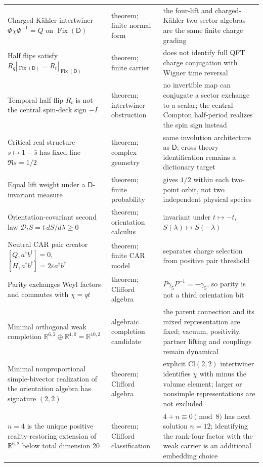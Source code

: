 \documentclass[11pt]{article}
\theoremstyle{definition}\newtheorem{definition}[theorem]{Definition}
\theoremstyle{remark}\newtheorem{remark}[theorem]{Remark}\newtheorem{conjecture}[theorem]{Conjecture}
\begin{document}
\begin{longtable}{>{\raggedright\arraybackslash}p{} >{\raggedright\arraybackslash}p{} >{\raggedright\arraybackslash}p{}}
Charged-K\"ahler intertwiner $\Phi\chi\Phi^{-1}=Q$ on $\operatorname{Fix}(\mathsf D)$ & theorem; finite normal form & the four-lift and charged-K\"ahler two-sector algebras are the same finite charge grading\\
Half flips satisfy $R_q|_{\operatorname{Fix}(\mathsf D)}=R_t|_{\operatorname{Fix}(\mathsf D)}$ & theorem; finite carrier & does not identify full QFT charge conjugation with Wigner time reversal\\
Temporal half flip $R_t$ is not the central spin-deck sign $-I$ & theorem; intertwiner obstruction & no invertible map can conjugate a sector exchange to a scalar; the central Compton half-period realizes the spin sign instead\\
Critical real structure $s\mapsto1-\bar s$ has fixed line $\Re s=1/2$ & theorem; complex geometry & same involution architecture as $\mathsf D$; cross-theory identification remains a dictionary target\\
Equal lift weight under a $\mathsf D$-invariant measure & theorem; finite probability & gives $1/2$ within each two-point orbit, not two independent physical species\\
Orientation-covariant second law $\mathscr D_tS=t\,dS/d\lambda\ge0$ & theorem; orientation calculus & invariant under $t\mapsto-t$, $S(\lambda)\mapsto S(-\lambda)$\\
Neutral CAR pair creator $[Q,a^\dagger b^\dagger]=0$, $[H,a^\dagger b^\dagger]=2\varepsilon a^\dagger b^\dagger$ & theorem; finite CAR model & separates charge selection from positive pair threshold\\
Parity exchanges Weyl factors and commutes with $\chi=qt$ & theorem; Clifford algebra & $P\gamma_5P^{-1}=-\gamma_5$, so parity is not a third orientation bit\\
Minimal orthogonal weak completion $\mathbb R^{6,2}\oplus\mathbb R^{4,0}=\mathbb R^{10,2}$ & algebraic completion candidate & the parent connection and its mixed representation are fixed; vacuum, positivity, partner lifting and couplings remain dynamical\\
Minimal nonproportional simple-bivector realization of the orientation algebra has signature $(2,2)$ & theorem; Clifford algebra & explicit $\mathrm{Cl}(2,2)$ intertwiner identifies $\chi$ with minus the volume element; larger or nonsimple representations are not excluded\\
$n=4$ is the unique positive reality-restoring extension of $\mathbb R^{6,2}$ below total dimension $20$ & theorem; Clifford classification & $4+n\equiv0\pmod 8$ has next solution $n=12$; identifying the rank-four factor with the weak carrier is an additional embedding choice\\

\end{longtable}
\end{document}
